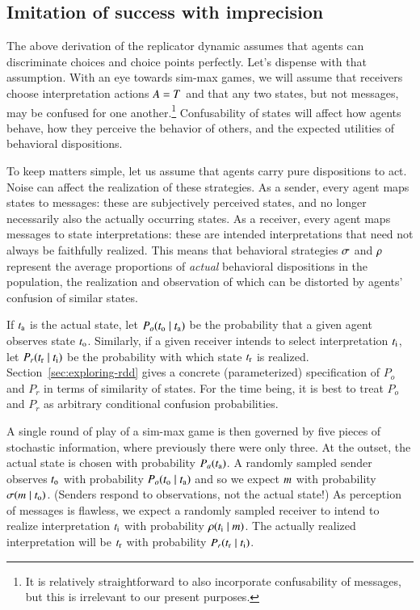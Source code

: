 \documentclass[fleqn,reqno,10pt]{article}
\begin{document}
\subsection{Imitation of success with imprecision}
\label{sec:imit-succ-with}

The above derivation of the replicator dynamic assumes that agents can discriminate choices and
choice points perfectly. Let's dispense with that assumption. With an eye towards sim-max
games, we will assume that receivers choose interpretation actions $A = T$ and that
any two states, but not messages, may be confused for one another.\footnote{It is relatively
  straightforward to also incorporate confusability of messages, but this is irrelevant to our
  present purposes.} Confusability of states will affect how agents behave, how they perceive
the behavior of others, and the expected utilities of behavioral dispositions.

To keep matters simple, let us assume that agents carry pure dispositions to act. Noise can
affect the realization of these strategies. As a sender, every agent maps states to messages:
these are subjectively perceived states, and no longer necessarily also the actually occurring
states. As a receiver, every agent maps messages to state interpretations: these are intended
interpretations that need not always be faithfully realized. This means that behavioral
strategies $\sigma$ and $\rho$ represent the average proportions of \emph{actual}
behavioral dispositions in the population, the realization and observation of which can be
distorted by agents' confusion of similar states.

If $t_{\mathrm{a}}$ is the actual state, let $P_o(t_{\mathrm{o}} \mid t_{\mathrm{a}})$ be the
probability that a given agent observes state $t_{\mathrm{o}}$. Similarly, if a given receiver
intends to select interpretation $t_{\mathrm{i}}$, let $P_r(t_{\mathrm{r}} \mid t_{\mathrm{i}})$ be
the probability with which state $t_{\mathrm{r}}$ is realized.  Section~\ref{sec:exploring-rdd}
gives a concrete (parameterized) specification of $P_o$ and $P_r$ in terms of similarity of
states. For the time being, it is best to treat $P_o$ and $P_r$ as arbitrary conditional
confusion probabilities.

A single round of play of a sim-max game is then governed by five pieces of stochastic
information, where previously there were only three. At the outset, the actual state is chosen
with probability $P_a(t_{\mathrm{a}})$. A randomly sampled sender observes $t_{\mathrm{o}}$ with
probability $P_o(t_{\mathrm{o}} \mid t_{\mathrm{a}})$ and so we expect $m$ with probability
$\sigma(m \mid t_{\mathrm{o}})$. (Senders respond to observations, not the actual
state!) As perception of messages is flawless, we expect a randomly sampled receiver to intend
to realize interpretation $t_{\mathrm{i}}$ with probability
$\rho(t_{\mathrm{i}} \mid m)$.  The actually realized interpretation will be
$t_{\mathrm{r}}$ with probability $P_r(t_{\mathrm{r}} \mid t_{\mathrm{i}})$.
\end{document}

